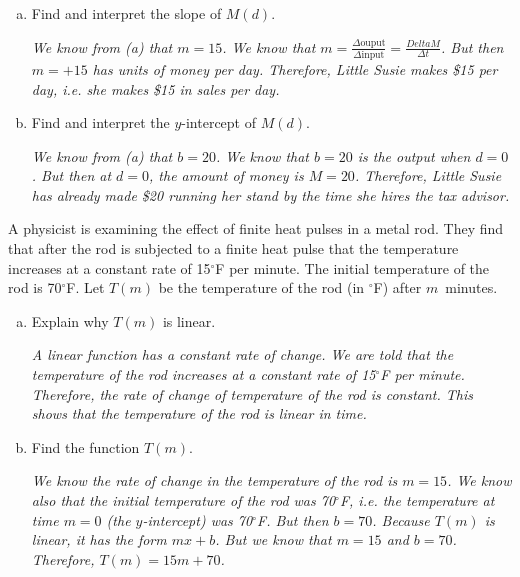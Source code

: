 \documentclass[12pt,letterpaper]{exam}
\begin{document}
\begin{questions}
\begin{enumerate}[(a)]
	{\itshape A linear function has the form $y= mx + b$. We know that $M(d)$ has the form $y= mx + b$ with $y= M$, $x= d$, $m= 15$, and $b= 20$. Therefore, $M(d)$ is linear.} \pvspace{2.6cm}
	
	\item Find and interpret the slope of $M(d)$. \pvspace{2.32cm}
	
	{\itshape We know from (a) that $m= 15$. We know that $m= \frac{\Delta \text{ouput}}{\Delta \text{input}}= \frac{Delta M}{\Delta t}$. But then $m= +15$ has units of money per day. Therefore, Little Susie makes \$15 per day, i.e. she makes \$15 in sales per day.} \pvspace{2.32cm}
	
	\item Find and interpret the $y$-intercept of $M(d)$. \pvspace{2.4cm}
	
	{\itshape We know from (a) that $b= 20$. We know that $b= 20$ is the output when $d= 0$. But then at $d= 0$, the amount of money is $M= 20$. Therefore, Little Susie has already made \$20 running her stand by the time she hires the tax advisor.} \pvspace{2.32cm}
	\end{enumerate} 



\newpage
\question[15] A physicist is examining the effect of finite heat pulses in a metal rod. They find that after the rod is subjected to a finite heat pulse that the temperature increases at a constant rate of 15$^\circ$F per minute. The initial temperature of the rod is 70$^\circ$F. Let $T(m)$ be the temperature of the rod (in $^\circ$F) after $m$~minutes. 
	\begin{enumerate}[(a)]
	\item Explain why $T(m)$ is linear. \pvspace{2cm}
	
	{\itshape A linear function has a constant rate of change. We are told that the temperature of the rod increases at a constant rate of 15$^\circ$F per minute. Therefore, the rate of change of temperature of the rod is constant. This shows that the temperature of the rod is linear in time.} \pvspace{2cm}
	
	\item Find the function $T(m)$. \pvspace{1.95cm}
	
	{\itshape We know the rate of change in the temperature of the rod is $m= 15$. We know also that the initial temperature of the rod was 70$^\circ$F, i.e. the temperature at time $m= 0$ (the $y$-intercept) was 70$^\circ$F. But then $b= 70$. Because $T(m)$ is linear, it has the form $mx + b$. But we know that $m= 15$ and $b= 70$. Therefore, $T(m)= 15m + 70$.} \pvspace{1.95cm}
	

\end{enumerate}
\end{questions}
\end{document}
